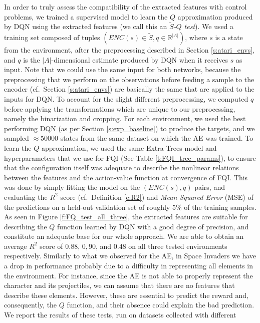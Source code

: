 In order to truly assess the compatibility of the extracted features 
with control problems, we trained a supervised model to learn the $Q$ 
approximation produced by DQN using the extracted features (we call this 
an \textit{$\tilde{S}$-$Q$ test}). 
We used a training set composed of tuples $(ENC(s) \in \tilde{S}, q \in \mathbb{R}^{|A|})$, 
where $s$ is a state from the environment, after the preprocessing described in 
Section \ref{s:atari_envs}, and $q$ is the $|A|$-dimensional estimate produced 
by DQN when it receives $s$ as input. 
Note that we could use the same input for both networks, because the 
preprocessing that we perform on the observations before feeding a sample to the
encoder (cf.\ Section \ref{s:atari_envs}) are basically the same that are 
applied to the inputs for DQN. To account for the slight different preprocessing,
we computed $q$ before applying the transformations which are unique to our 
preprocessing, namely the binarization and cropping. 
For each environment, we used the best performing DQN (as per Section \ref{s:exp_baseline}) 
to produce the targets, and we sampled $\approx50000$ states from the same 
dataset on which the AE was trained.
To learn the $Q$ approximation, we used the same Extra-Trees model and 
hyperparameters that we use for FQI (See Table \ref{t:FQI_tree_params}), to 
ensure that the configuration itself was adequate to describe the nonlinear 
relations between the features and the action-value function at convergence of 
FQI. 
This was done by simply fitting the model on the $(ENC(s), q)$ pairs, and 
evaluating the $R^2$ score (cf.\ Definition \eqref{e:R2}) and \textit{Mean 
Squared Error} (MSE) of the predictions on a held-out validation set of roughly 
$5\%$ of the training samples.
As seen in Figure \ref{f:FQ_test_all_three}, the extracted features are suitable
for describing the $Q$ function learned by DQN with a good degree of precision, 
and constitute an adequate base for our whole approach. 
We are able to obtain an average $R^2$ score of $0.88$, $0,90$, and $0.48$ on 
all three tested environments respectively.
Similarly to what we observed for the AE, in Space Invaders we have a drop in 
performance probably due to a difficulty in representing all elements in 
the environment. For instance, since the AE is not able to properly represent 
the character and its projectiles, we can assume that there are no features that
describe these elements. However, these are essential to predict the reward 
and, consequently, the $Q$ function, and their absence could explain the bad
prediction.
We report the results of these tests, run on datasets collected with different
